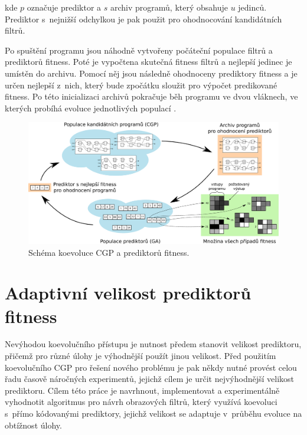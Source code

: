 \documentclass[czech]{ExcelAtFIT} %
\begin{document}
\noindent{}kde $p$ označuje prediktor a $s$ archiv programů, který obsahuje $u$ jedinců. Prediktor s~nejnižší odchylkou je pak použit pro ohodnocování kandidátních filtrů.

Po spuštění programu jsou náhodně vytvořeny po\-čá\-teč\-ní populace filtrů a prediktorů fitness. Poté je vypočtena skutečná fitness filtrů a nejlepší jedinec je umís\-těn do archivu. Pomocí něj jsou následně ohod\-no\-ceny prediktory fitness a je určen nejlepší z~nich, který bude zpočátku sloužit pro výpočet predikované fitness. Po této inicializaci archivů pokračuje běh programu ve dvou vláknech, ve kterých probíhá evoluce jed\-not\-li\-vých populací \cite{SikuPPSN}.

\begin{figure}[t]
    \centering\includegraphics[width=0.8\linewidth]{images/coevolution-if.pdf}
    \caption{Schéma koevoluce CGP a prediktorů fitness.}
    \label{fig:CoevolutionScheme}
\end{figure}



\section{Adaptivní velikost prediktorů fitness}
\label{sec:AdaptiveSize}

Nevýhodou koevolučního přístupu je nutnost předem stanovit velikost prediktoru, přičemž pro různé úlohy je výhodnější použít jinou velikost. Před použitím koevolučního CGP pro řešení nového problému je pak někdy nutné provést celou řadu časově náročných experimentů, jejichž cílem je určit nejvýhodnější velikost prediktoru. Cílem této práce je navrhnout, implementovat a experimentálně vyhodnotit algoritmus pro návrh obrazových filtrů, který využívá koevoluci s~přímo kódovanými prediktory, jejichž velikost se adaptuje v~průběhu evoluce na obtížnost úlohy.
\end{document}
